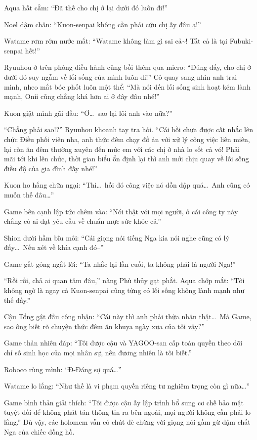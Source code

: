 \documentclass[../main.tex]{subfiles}
\begin{document}
Aqua hất cằm: ``Đã thế cho chị ở lại dưới đó luôn đi!''

Noel dậm chân: ``Kuon-senpai không cần phải cứu chị ấy đâu ạ!''

Watame rơm rớm nước mắt: ``Watame không làm gì sai cả\~{}! Tất cả là tại Fubuki-senpai hết!''

Ryuuhou ở trên phòng điều hành cũng bồi thêm qua micro: ``Đúng đấy, cho chị ở dưới đó suy ngẫm về lối sống của mình luôn đi!'' Cô quay sang nhìn anh trai mình, nheo mắt bóc phốt luôn một thể: ``Mà nói đến lối sống sinh hoạt kém lành mạnh, Onii cũng chẳng khá hơn ai ở đây đâu nhé!''

Kuon giật mình gãi đầu: ``Ơ\dots\ sao lại lôi anh vào nữa?''

``Chẳng phải sao!?'' Ryuuhou khoanh tay tra hỏi. ``Cái hồi chưa được cất nhắc lên chức Điều phối viên nha, anh thức đêm chạy đồ án với xử lý công việc liên miên, lại còn ăn đêm thường xuyên đến mức em với các chị ở nhà lo sốt cả vó! Phải mãi tới khi lên chức, thời gian biểu ổn định lại thì anh mới chịu quay về lối sống điều độ của gia đình đấy nhé!''

Kuon ho hắng chữa ngại: ``Thì\dots\ hồi đó công việc nó dồn dập quá\dots\ Anh cũng có muốn thế đâu\dots''

Game bên cạnh lập tức chêm vào: ``Nói thật với mọi người, ở cái công ty này chẳng có ai đạt yêu cầu về chuẩn mực sức khỏe cả.''

Shion dưới hầm bĩu môi: ``Cái giọng nói tiếng Nga kia nói nghe cũng có lý đấy\dots\ Nếu xét về khía cạnh đó--''

Game gắt gỏng ngắt lời: ``Ta nhắc lại lần cuối, ta không phải là người Nga!''

``Rồi rồi, chả ai quan tâm đâu,'' nàng Phù thủy gạt phắt. Aqua chớp mắt: ``Tôi không ngờ là ngay cả Kuon-senpai cũng từng có lối sống không lành mạnh như thế đấy.''

Cậu Tổng gật đầu công nhận: ``Cái này thì anh phải thừa nhận thật\dots\ Mà Game, sao ông biết rõ chuyện thức đêm ăn khuya ngày xưa của tôi vậy?''

Game thản nhiên đáp: ``Tôi được cậu và YAGOO-san cấp toàn quyền theo dõi chỉ số sinh học của mọi nhân sự, nên đương nhiên là tôi biết.''

Roboco rùng mình: ``Đ-Đáng sợ quá\dots''

Watame lo lắng: ``Như thế là vi phạm quyền riêng tư nghiêm trọng còn gì nữa\dots''

Game bình thản giải thích: ``Tôi được cậu ấy lập trình bổ sung cơ chế bảo mật tuyệt đối để không phát tán thông tin ra bên ngoài, mọi người không cần phải lo lắng.'' Dù vậy, các holomem vẫn có chút dè chừng với giọng nói gầm gừ đậm chất Nga của chiếc đồng hồ.
\end{document}
